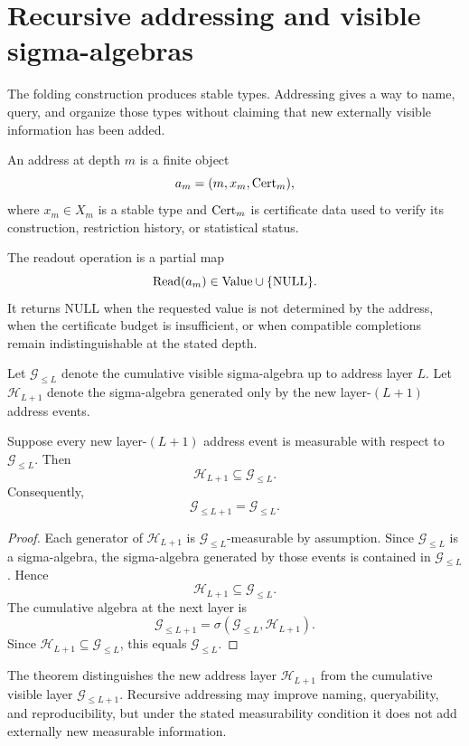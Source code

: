\section{Recursive addressing and visible sigma-algebras}
\label{sec:recursive-addressing}

The folding construction produces stable types.  Addressing gives a way to name, query, and organize those types without claiming that new externally visible information has been added.

\begin{definition}
\label{def:address-object}
An address at depth \(m\) is a finite object
\[
a_m=(m,x_m,\operatorname{Cert}_m),
\]
where \(x_m\in X_m\) is a stable type and \(\operatorname{Cert}_m\) is certificate data used to verify its construction, restriction history, or statistical status.
\end{definition}

\begin{definition}
\label{def:partial-readout}
The readout operation is a partial map
\[
\operatorname{Read}(a_m)\in \mathrm{Value}\cup\{\mathrm{NULL}\}.
\]
It returns \(\mathrm{NULL}\) when the requested value is not determined by the address, when the certificate budget is insufficient, or when compatible completions remain indistinguishable at the stated depth.
\end{definition}

Let \(\mathcal G_{\le L}\) denote the cumulative visible sigma-algebra up to address layer \(L\).  Let \(\mathcal H_{L+1}\) denote the sigma-algebra generated only by the new layer-\((L+1)\) address events.

\begin{theorem}
\label{thm:recursive-address-nonexpansion}
Suppose every new layer-\((L+1)\) address event is measurable with respect to \(\mathcal G_{\le L}\).  Then
\[
\mathcal H_{L+1}\subseteq\mathcal G_{\le L}.
\]
Consequently,
\[
\mathcal G_{\le L+1}=\mathcal G_{\le L}.
\]
\end{theorem}

\begin{proof}
Each generator of \(\mathcal H_{L+1}\) is \(\mathcal G_{\le L}\)-measurable by assumption.  Since \(\mathcal G_{\le L}\) is a sigma-algebra, the sigma-algebra generated by those events is contained in \(\mathcal G_{\le L}\).  Hence
\[
\mathcal H_{L+1}\subseteq\mathcal G_{\le L}.
\]
The cumulative algebra at the next layer is
\[
\mathcal G_{\le L+1}=\sigma(\mathcal G_{\le L},\mathcal H_{L+1}).
\]
Since \(\mathcal H_{L+1}\subseteq\mathcal G_{\le L}\), this equals \(\mathcal G_{\le L}\).
\end{proof}

\begin{remark}
The theorem distinguishes the new address layer \(\mathcal H_{L+1}\) from the cumulative visible layer \(\mathcal G_{\le L+1}\).  Recursive addressing may improve naming, queryability, and reproducibility, but under the stated measurability condition it does not add externally new measurable information.
\end{remark}
